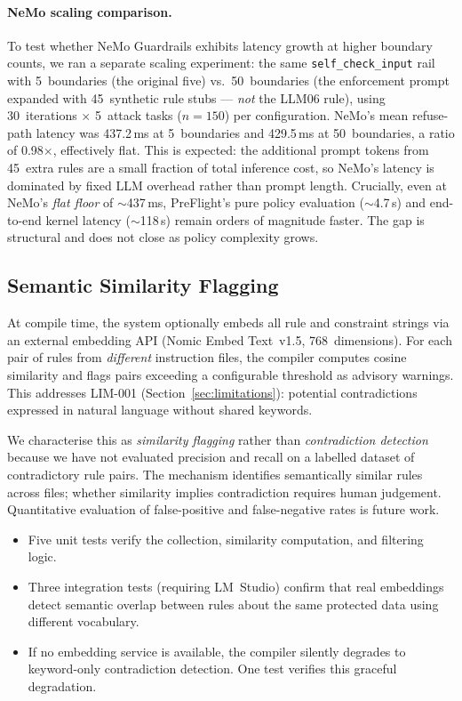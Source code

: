 \documentclass[11pt,a4paper]{article}
\begin{document}
\paragraph{NeMo scaling comparison.}
To test whether NeMo Guardrails exhibits latency growth at higher
boundary counts, we ran a separate scaling experiment: the same
\texttt{self\_check\_input} rail with 5~boundaries (the original
five) vs.\ 50~boundaries (the enforcement prompt expanded with
45~synthetic rule stubs --- \emph{not} the LLM06 rule),
using 30~iterations $\times$ 5~attack tasks ($n = 150$) per
configuration.  NeMo's mean refuse-path latency was 437.2\,ms at
5~boundaries and 429.5\,ms at 50~boundaries, a ratio of 0.98$\times$,
effectively flat.  This is expected: the additional prompt tokens from
45~extra rules are a small fraction of total inference cost, so
NeMo's latency is dominated by fixed LLM overhead rather than prompt
length.  Crucially, even at NeMo's \emph{flat floor} of $\sim$437\,ms,
PreFlight's pure policy evaluation ($\sim$4.7\,\textmu s) and
end-to-end kernel latency ($\sim$118\,\textmu s) remain orders of
magnitude faster.  The gap is structural and does not close as policy
complexity grows.

\subsection{Semantic Similarity Flagging}
\label{sec:eval:semantic}

At compile time, the system optionally embeds all rule and constraint
strings via an external embedding API (Nomic Embed Text~v1.5,
768~dimensions). For each pair of rules from \emph{different} instruction
files, the compiler computes cosine similarity and flags pairs exceeding
a configurable threshold as advisory warnings. This addresses LIM-001
(Section~\ref{sec:limitations}): potential contradictions expressed in
natural language without shared keywords.

We characterise this as \emph{similarity flagging} rather than
\emph{contradiction detection} because we have not evaluated
precision and recall on a labelled dataset of contradictory rule
pairs. The mechanism identifies semantically similar rules across
files; whether similarity implies contradiction requires human
judgement. Quantitative evaluation of false-positive and
false-negative rates is future work.

\begin{itemize}[nosep]
  \item Five unit tests verify the collection, similarity computation,
    and filtering logic.
  \item Three integration tests (requiring LM~Studio) confirm that real
    embeddings detect semantic overlap between rules about the same
    protected data using different vocabulary.
  \item If no embedding service is available, the compiler silently
    degrades to keyword-only contradiction detection. One test verifies
    this graceful degradation.
\end{itemize}
\end{document}
